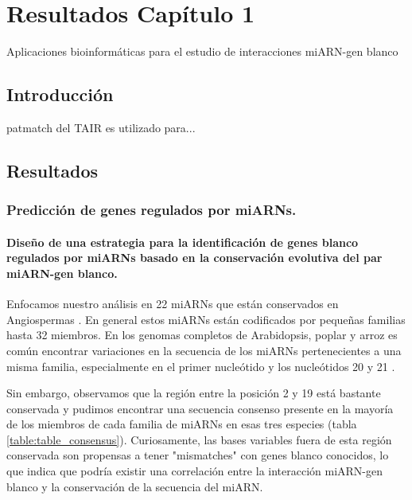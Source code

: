 \graphicspath{{Chapter1/Figs/}}


\chapter{Resultados Capítulo 1} 
{\LARGE Aplicaciones bioinformáticas para el estudio de interacciones miARN-gen blanco}

\section{Introducción}
patmatch del TAIR es utilizado para...

\section{Resultados} 

\subsection{Predicción de genes regulados por miARNs.} %
\subsubsection{Diseño de una estrategia para la identificación de genes blanco regulados por miARNs basado en la conservación evolutiva del par miARN-gen blanco.}

Enfocamos nuestro análisis en 22 miARNs que están conservados en Angiospermas \citep{citeulike:8816489,10.1371/journal.pgen.1002419}.
En general estos miARNs están codificados por pequeñas familias hasta 32 miembros.
En los genomas completos de Arabidopsis, poplar y arroz es común encontrar variaciones en la secuencia de los miARNs pertenecientes a una misma familia, especialmente en el primer nucleótido y los nucleótidos 20 y 21 \citep{10.1371/journal.pgen.1002419}.

Sin embargo, observamos que la región entre la posición 2 y 19 está bastante conservada y pudimos encontrar una secuencia consenso presente en la mayoría de los miembros de cada familia de miARNs en esas tres especies (tabla \ref{table:table_consensus}).
Curiosamente, las bases variables fuera de esta región conservada son propensas a tener "mismatches" con genes blanco conocidos, lo que indica que podría existir una correlación entre la interacción miARN-gen blanco y la conservación de la secuencia del miARN.


